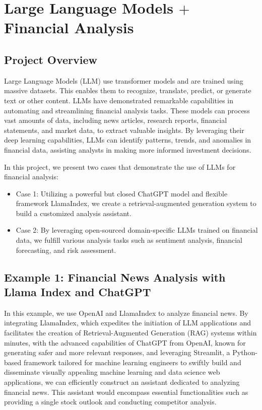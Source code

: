\documentclass[11pt]{article}
\begin{document}
\section{Large Language Models $+$ Financial Analysis}
\subsection{Project Overview}
Large Language Models (LLM) use transformer models and are trained using massive datasets. This enables them to recognize, translate, predict, or generate text or other content. LLMs have demonstrated remarkable capabilities in automating and streamlining financial analysis tasks. These models can process vast amounts of data, including news articles, research reports, financial statements, and market data, to extract valuable insights. By leveraging their deep learning capabilities, LLMs can identify patterns, trends, and anomalies in financial data, assisting analysts in making more informed investment decisions. 

In this project, we present two cases that demonstrate the use of LLMs for financial analysis:
\begin{itemize}
\item Case 1: Utilizing a powerful but closed ChatGPT model and flexible framework LlamaIndex, we create a retrieval-augmented generation system to build a customized analysis assistant.
\item Case 2: By leveraging open-sourced domain-specific LLMs trained on financial data, we fulfill various analysis tasks such as sentiment analysis, financial forecasting, and risk assessment.
\end{itemize}


\subsection{Example 1: Financial News Analysis with Llama Index and ChatGPT}
In this example, we use OpenAI and LlamaIndex to analyze financial news. 
By integrating LlamaIndex, which expedites the initiation of LLM applications and facilitates the creation of Retrieval-Augmented Generation (RAG) systems within minutes, with the advanced capabilities of ChatGPT from OpenAI, known for generating safer and more relevant responses, and leveraging Streamlit, a Python-based framework tailored for machine learning engineers to swiftly build and disseminate visually appealing machine learning and data science web applications, we can efficiently construct an assistant dedicated to analyzing financial news. This assistant would encompass essential functionalities such as providing a single stock outlook and conducting competitor analysis.
\end{document}
